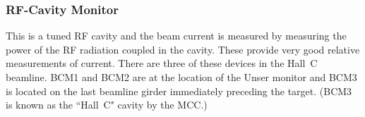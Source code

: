 \subsubsection{RF-Cavity Monitor} This is a tuned RF cavity and the beam current
is measured by measuring the power of the RF radiation coupled in the cavity.
These provide very good relative measurements of current. There are three
of these
devices in the Hall~C beamline. BCM1 and BCM2 are at the location of the Unser
monitor and BCM3 is located on the last beamline girder
immediately preceding the target.  (BCM3 is known as the ``Hall~C" cavity 
by the MCC.)



